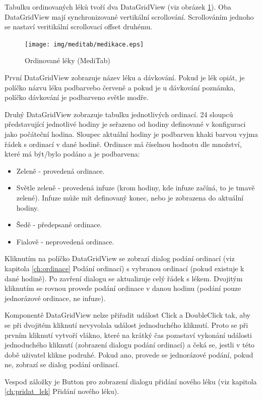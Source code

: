 Tabulku ordinovaných léků tvoří dva DataGridView (viz obrázek \ref{fig:medikace}). Oba DataGridView mají synchronizované vertikální scrollování. Scrollováním jednoho se nastaví veritikální scrollovací offset druhému.

\begin{figure}[H]
	\centering
	\texttt{[image: img/meditab/medikace.eps]}
	\caption{Ordinované léky (MediTab)}
  \label{fig:medikace}
\end{figure}

První DataGridView zobrazuje název léku a dávkování. Pokud je lék opiát, je políčko názvu léku podbarvebo červeně a pokud je u dávkování poznámka, políčko dávkování je podbarveno světle modře.

Druhý DataGridView zobrazuje tabulku jednotlivých ordinací. 24 sloupců představující jednotlivé hodiny je seřazeno od hodiny definované v konfiguraci jako počáteční hodina. Sloupec aktuální hodiny je podbarven khaki barvou vyjma řádek s ordinací v dané hodině. Ordinace má číselnou hodnotu dle množství, které má být/bylo podáno a je podbarvena:

\begin{itemize}
	\item Zeleně - provedená ordinace.
	\item Světle zeleně - provedená infuze (krom hodiny, kde infuze začíná, to je tmavě zelené). Infuze může mít definovaný konec, nebo je zobrazena do aktuální hodiny.
	\item Šedě - předepsané ordinace.
	\item Fialově - neprovedená ordinace.
\end{itemize}

Kliknutím na políčko DataGridView se zobrazí dialog podání ordinací (viz kapitola \ref{ch:ordinace} Podání ordinací) s vybranou ordinací (pokud existuje k dané hodině). Po zavření dialogu se aktualizuje celý řádek s lékem. Dvojitým kliknutím se rovnou provede podání ordinace v danou hodinu (podání pouze jednorázové ordinace, ne infuze).

Komponentě DataGridView nelze přiřadit událost Click a DoubleClick tak, aby se při dvojitém kliknutí nevyvolala událost jednoduchého kliknutí. Proto se při prvním kliknutí vytvoří vlákno, které na krátký čas pozastaví vykonání události jednoduchého kliknutí (zobrazení dialogu podání ordinací) a čeká se, jestli v této době uživatel klikne podruhé. Pokud ano, provede se jednorázové podání, pokud ne, zobrazí se dialog podání ordinací.

Vespod záložky je Button pro zobrazení dialogu přidání nového léku (viz kapitola \ref{ch:pridat_lek} Přidání nového léku).



